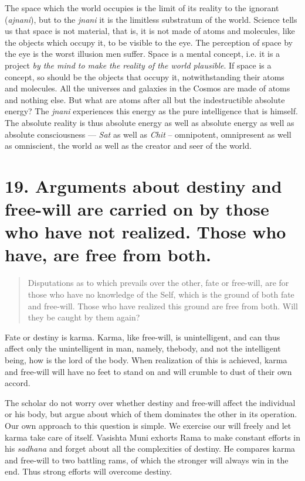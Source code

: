 \documentclass[12pt]{report}
\begin{document}

The space which the world occupies is the limit of its reality to the
ignorant (\emph{ajnani}), but to the \emph{jnani} it is the limitless
substratum of the world. Science tells us that space is not material,
that is, it is not made of atoms and molecules, like the objects which
occupy it, to be visible to the eye. The perception of space by the
eye is the worst illusion men suffer. Space is a mental concept,
i.e. it is a project \emph{by the mind to make the reality of the
  world plausible}. If space is a concept, so should be the objects
that occupy it, notwithstanding their atoms and molecules. All the
universes and galaxies in the Cosmos are made of atoms and nothing
else. But what are atoms after all but the indestructible absolute
energy? The \emph{jnani} experiences this energy as the pure
intelligence that is himself. The absolute reality is thus absolute
energy as well as absolute energy as well as absolute consciousness
--- \emph{Sat} as well as \emph{Chit} -- omnipotent, omnipresent as
well as omniscient, the world as well as the creator and seer of the
world. 

\section{19. Arguments about destiny and free-will are carried on by
  those who have not realized. Those who have, are free from both.}

\begin{quote}
  Disputations as to which prevails over the other, fate or free-will,
  are for those who have no knowledge of the Self, which is the ground
  of both fate and free-will. Those who have realized this ground are
  free from both. Will they be caught by them again?
\end{quote}


Fate or destiny is karma. Karma, like free-will, is unintelligent, and
can thus affect only the unintelligent in man, namely, thebody, and
not the intelligent being, how is the lord of the body. When
realization of this is achieved, karma and free-will will have no feet
to stand on and will crumble to dust of their own accord.

The scholar do not worry over whether destiny and free-will affect the
individual or his body, but argue about which of them dominates the
other in its operation. Our own approach to this question is
simple. We exercise our will freely and let karma take care of
itself. Vasishta Muni exhorts Rama to make constant efforts in his
\emph{sadhana} and forget about all the complexities of destiny. He
compares karma and free-will to two battling rams, of which the
stronger will always win in the end. Thus strong efforts will overcome
destiny.
\end{document}
